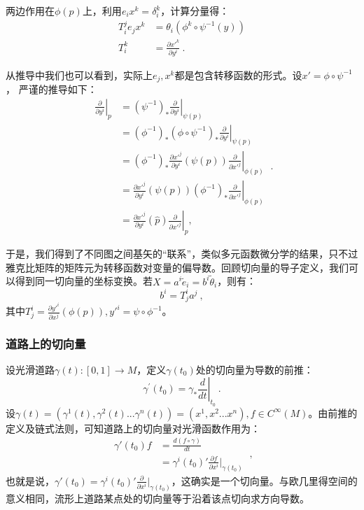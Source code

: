 两边作用在$\phi(p)$上，利用$e_ix^k=\delta^k_i$，计算分量得：
\begin{equation}
\begin{aligned}
 T^j_i e_j x^k&=\theta_i (\phi^k\circ \psi^{-1}(y))\\
T^k_i&=\frac{\partial x'^{k}}{\partial y^i}~.
\end{aligned}
\end{equation}

从推导中我们也可以看到，实际上$e_j,x^k$都是包含转移函数的形式。设$x'=\phi\circ\psi^{-1}$，
严谨的推导如下：
\begin{equation}
\begin{aligned}
\left.\frac{\partial}{\partial y^i}\right|_p & =\left.\left(\psi^{-1}\right)_* \frac{\partial}{\partial y^i}\right|_{\psi(p)} \\
& =\left.\left(\phi^{-1}\right)_*\left(\phi \circ \psi^{-1}\right)_* \frac{\partial}{\partial y^i}\right|_{\psi(p)} \\
& =\left.\left(\phi^{-1}\right)_* \frac{\partial x'^j}{\partial y^i}(\psi(p)) \frac{\partial}{\partial x'^j}\right|_{\phi(p)} \\
& =\left.\frac{\partial x'^j}{\partial y^i}(\psi(p))\left(\phi^{-1}\right)_* \frac{\partial}{\partial x'^j}\right|_{\phi(p)} \\
& =\left.\frac{\partial x'^j}{\partial y^i}(\widehat{p}) \frac{\partial}{\partial x'^j}\right|_p,
\end{aligned}~.
\end{equation}

于是，我们得到了不同图之间基矢的“联系”，类似多元函数微分学的结果，只不过雅克比矩阵的矩阵元为转移函数对变量的偏导数。回顾切向量的导子定义，我们可以得到同一切向量的坐标变换。若$X=a^i\widetilde e_i=b^i\widetilde  \theta_i$，则有：
\begin{equation}
b^i=T^i_ja^j~,
\end{equation}
其中$T^i_j=\frac{\partial y'^{i}}{\partial x^j}(\phi(p)),y'^i=\psi\circ\phi^{-1}$。
\subsubsection{道路上的切向量}
设光滑道路$\gamma(t):[0,1]\rightarrow M$，定义$\gamma(t_0)$处的切向量为导数的前推：
\begin{equation}
\gamma^{\prime}\left(t_0\right)=\left.\gamma_* \frac{d}{d t}\right|_{t_0}~.
\end{equation}
设$\gamma(t)=(\gamma^1(t),\gamma^2(t)...\gamma^n(t))=(x^1,x^2...x^n),f\in C^{\infty}(M)$。由前推的定义及链式法则，可知道路上的切向量对光滑函数作用为：
\begin{equation}
\begin{aligned}
\gamma'(t_0)f&=\frac{d(f\circ\gamma)}{dt}\\
&=\gamma^i(t_0)'\frac{\partial f}{\partial x^i}\bigg|_{\gamma(t_0)}
\end{aligned}~,
\end{equation}
也就是说，$\gamma'(t_0)=\gamma^i(t_0)'\frac{\partial }{\partial x^i}\bigg|_{\gamma(t_0)}$，这确实是一个切向量。与欧几里得空间的意义相同，流形上道路某点处的切向量等于沿着该点切向求方向导数。

